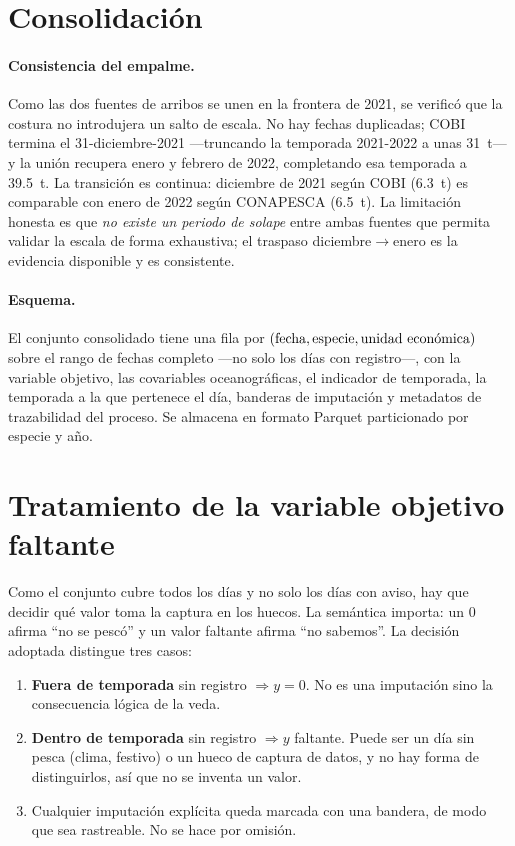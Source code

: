 \section{Consolidación}
\label{sec:datos_etl}



\paragraph{Consistencia del empalme.} Como las dos fuentes de arribos se unen en la frontera de
2021, se verificó que la costura no introdujera un salto de escala. No hay fechas duplicadas;
COBI termina el 31-diciembre-2021 ---truncando la temporada 2021-2022 a unas 31~t--- y la unión
recupera enero y febrero de 2022, completando esa temporada a 39.5~t. La transición es continua:
diciembre de 2021 según COBI (6.3~t) es comparable con enero de 2022 según CONAPESCA (6.5~t).
La limitación honesta es que \emph{no existe un periodo de solape} entre ambas fuentes que
permita validar la escala de forma exhaustiva; el traspaso diciembre$\to$enero es la evidencia
disponible y es consistente.

\paragraph{Esquema.} El conjunto consolidado tiene una fila por
$(\text{fecha}, \text{especie}, \text{\ue{}})$ sobre el rango de fechas completo ---no solo los
días con registro---, con la variable objetivo, las covariables oceanográficas, el indicador de
temporada, la temporada a la que pertenece el día, banderas de imputación y metadatos de
trazabilidad del proceso. Se almacena en formato Parquet particionado por especie y año.

\section{Tratamiento de la variable objetivo faltante}
\label{sec:datos_faltantes}

Como el conjunto cubre todos los días y no solo los días con aviso, hay que decidir qué valor
toma la captura en los huecos. La semántica importa: un $0$ afirma ``no se pescó'' y un valor
faltante afirma ``no sabemos''. La decisión adoptada distingue tres casos:

\begin{enumerate}
  \item \textbf{Fuera de temporada} sin registro $\Rightarrow y = 0$. No es una imputación sino
  la consecuencia lógica de la veda.
  \item \textbf{Dentro de temporada} sin registro $\Rightarrow y$ faltante. Puede ser un día sin
  pesca (clima, festivo) o un hueco de captura de datos, y no hay forma de distinguirlos, así
  que no se inventa un valor.
  \item Cualquier imputación explícita queda marcada con una bandera, de modo que sea
  rastreable. No se hace por omisión.
\end{enumerate}

